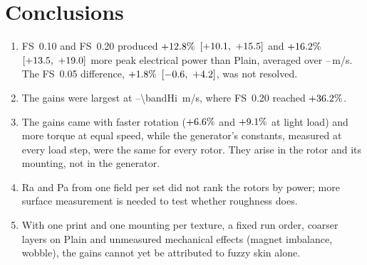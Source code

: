 \documentclass[11pt]{article}
\begin{document}
\section{Conclusions}\label{sec:conclusions}
\begin{enumerate}
  \item FS~0.10 and FS~0.20 produced $+12.8\%$ $[+10.1,\ +15.5]$ and $+16.2\%$ $[+13.5,\ +19.0]$
        more peak electrical power than Plain, averaged over \vLo--\vHi\,\si{m/s}. The FS~0.05
        difference, $+1.8\%$ $[-0.6,\ +4.2]$, was not resolved.
  \item The gains were largest at \bandLo--\SI{\bandHi}{m/s}, where FS~0.20 reached $+36.2\%$.
  \item The gains came with faster rotation ($+6.6\%$ and $+9.1\%$ at light load) and more
        torque at equal speed, while the generator's constants, measured at every load step, were the
        same for every rotor. They arise in the rotor and its mounting, not in the generator.
  \item Ra and Pa from one field per set did not rank the rotors by power; more surface measurement
        is needed to test whether roughness does.
  \item With one print and one mounting per texture, a fixed run order, coarser layers on Plain and
        unmeasured mechanical effects (magnet imbalance, wobble), the gains cannot yet be attributed
        to fuzzy skin alone.
\end{enumerate}

\end{document}
